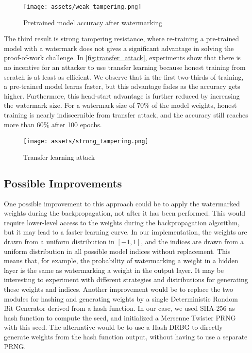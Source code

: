 \documentclass{article}
\begin{document}
\begin{multicols}{2}
	\begin{figure}[htbp]
		\centering
		\texttt{[image: assets/weak\_tampering.png]}
		\caption{Pretrained model accuracy after watermarking}
		\label{fig:watermark_hit}
	\end{figure}

	The third result is strong tampering resistance, where re-training a pre-trained model with a watermark does not gives a significant advantage in solving the proof-of-work challenge. In \autoref{fig:transfer_attack}, experiments show that there is no incentive for an attacker to use transfer learning because honest training from scratch is at least as efficient. We observe that in the first two-thirds of training, a pre-trained model learns faster, but this advantage fades as the accuracy gets higher. Furthermore, this head-start advantage is further reduced by increasing the watermark size. For a watermark size of 70\% of the model weights, honest training is nearly indiscernible from transfer attack, and the accuracy still reaches more than 60\% after 100 epochs.

	\begin{figure}[htbp]
		\centering
		\texttt{[image: assets/strong\_tampering.png]}
		\caption{Transfer learning attack}
		\label{fig:transfer_attack}
	\end{figure}

	\subsection{Possible Improvements}

	One possible improvement to this approach could be to apply the watermarked weights during the backpropagation, not after it has been performed. This would require lower-level access to the weights during the backpropagation algorithm, but it may lead to a faster learning curve.
	In our implementation, the weights are drawn from a uniform distribution in $ [-1, 1] $, and the indices are drawn from a uniform distribution in all possible model indices without replacement. This means that, for example, the probability of watermarking a weight in a hidden layer is the same as watermarking a weight in the output layer. It may be interesting to experiment with different strategies and distributions for generating these weights and indices.
	Another improvement would be to replace the two modules for hashing and generating weights by a single Deterministic Random Bit Generator derived from a hash function. In our case, we used SHA-256 as hash function to compute the seed, and initialized a Mersenne Twister PRNG with this seed. The alternative would be to use a Hash-DRBG\cite{barker_kelsey_2015} to directly generate weights from the hash function output, without having to use a separate PRNG.


\end{multicols}
\end{document}
